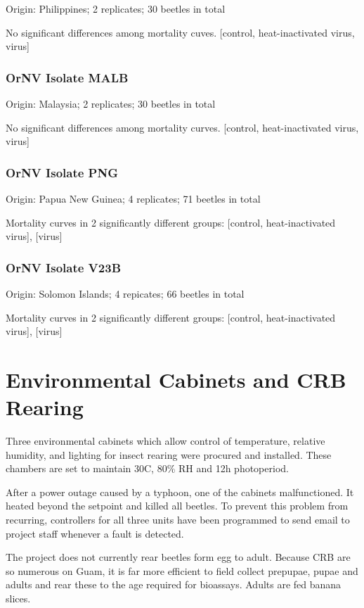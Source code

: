 \documentclass[12pt,letterpaper,english]{scrartcl}
\begin{document}
Origin: Philippines; 2 replicates; 30 beetles in total

No significant differences among mortality cuves. {[}control, heat-inactivated
virus, virus{]}

\subsubsection{OrNV Isolate MALB}

Origin: Malaysia; 2 replicates; 30 beetles in total

No significant differences among mortality curves. {[}control, heat-inactivated
virus, virus{]}

\subsubsection{OrNV Isolate PNG}

Origin: Papua New Guinea; 4 replicates; 71 beetles in total

Mortality curves in 2 significantly different groups: {[}control,
heat-inactivated virus{]}, {[}virus{]}

\subsubsection{OrNV Isolate V23B}

Origin: Solomon Islands; 4 repicates; 66 beetles in total

Mortality curves in 2 significantly different groups: {[}control,
heat-inactivated virus{]}, {[}virus{]}

\section{Environmental Cabinets and CRB Rearing}

Three environmental cabinets which allow control of temperature, relative
humidity, and lighting for insect rearing were procured and installed.
These chambers are set to maintain 30\textdegree{}C, 80\% RH and
12h photoperiod.

After a power outage caused by a typhoon, one of the cabinets malfunctioned.
It heated beyond the setpoint and killed all beetles. To prevent this
problem from recurring, controllers for all three units have been
programmed to send email to project staff whenever a fault is detected.

The project does not currently rear beetles form egg to adult. Because
CRB are so numerous on Guam, it is far more efficient to field collect
prepupae, pupae and adults and rear these to the age required for
bioassays. Adults are fed banana slices.
\end{document}
